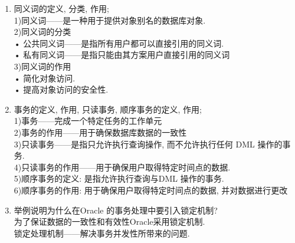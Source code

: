 \documentclass{article}                     %
\numberwithin{equation}{section}            %
\numberwithin{figure}{section}              %
\numberwithin{table}{section}               %
\begin{document}
\begin{enumerate}
\item 同义词的定义, 分类, 作用; \\
1)同义词——是一种用于提供对象别名的数据库对象. \\
2)同义词的分类\\
• 公共同义词——是指所有用户都可以直接引用的同义词. \\
• 私有同义词——是指只能由其方案用户直接引用的同义词\\
3)同义词的作用\\
• 简化对象访问. \\
• 提高对象访问的安全性. \\





\item 事务的定义, 作用, 只读事务, 顺序事务的定义, 作用; \\
1)事务——完成一个特定任务的工作单元\\
2)事务的作用——用于确保数据库数据的一致性\\
3)只读事务——是指只允许执行查询操作, 而不允许执行任何 DML 操作的事务. \\
4)只读事务的作用——用于确保用户取得特定时间点的数据. \\
5)顺序事务的定义: 是指允许执行查询与DML 操作的事务. \\
6)顺序事务的作用: 用于确保用户取得特定时间点的数据, 并对数据进行更改\\






\item 举例说明为什么在Oracle 的事务处理中要引入锁定机制? \\
为了保证数据的一致性和有效性Oracle采用锁定机制. \\
锁定处理机制——解决事务并发性所带来的问题. \\







\end{enumerate}
\end{document}
